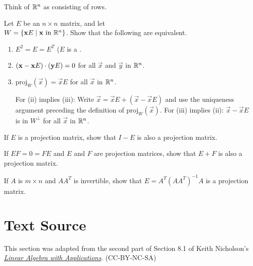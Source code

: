 \documentclass{ximera}
\begin{document}
\begin{problem}
Think of $\mathbb{R}^n$ as consisting of rows.

\begin{problem}\label{prob:8_1_17.1}
\item Let $E$ be an $n \times n$ matrix, and let \\ $W = \{\mathbf{x} E \mid \mathbf{x} \mbox{ in } \mathbb{R}^n\}$. Show that the following are equivalent.


\begin{enumerate}[label={\roman*.}]
\item $E^{2} = E = E^{T}$ ($E$ is a .

\item $(\mathbf{x} - \mathbf{x}E) \cdot (\mathbf{y}E) = 0$ for all $\vec{x}$ and $\vec{y}$ in $\mathbb{R}^n$.

\item $\mbox{proj}_W(\vec{x}) = \vec{x}E$ for all $\vec{x}$ in $\mathbb{R}^n$.
\begin{hint}
For (ii) implies (iii): Write $\vec{x} = \vec{x}E + (\vec{x} - \vec{x}E)$ and use the uniqueness argument preceding the definition of $\mbox{proj}_W(\vec{x})$. For (iii) implies (ii): $\vec{x} - \vec{x}E$ is in $W^\perp$ for all $\vec{x}$ in $\mathbb{R}^n$.
\end{hint}
\end{enumerate}
\end{problem}

\begin{problem}\label{prob:8_1_17.2}
If $E$ is a projection matrix, show that $I - E$ is also a projection matrix.
\end{problem}

\begin{problem}\label{prob:8_1_17.3}
If $EF = 0 = FE$ and $E$ and $F$ are projection matrices, show that $E + F$ is also a projection matrix.

\end{problem}

\begin{problem}\label{prob:8_1_17.4}
If $A$ is $m \times n$ and $AA^{T}$ is invertible, show that $E = A^{T}(AA^{T})^{-1}A$ is a projection matrix.
\end{problem}

\end{problem}




\section*{Text Source} This section was adapted from the second part of Section 8.1 of Keith Nicholson's \href{https://open.umn.edu/opentextbooks/textbooks/linear-algebra-with-applications}{\it Linear Algebra with Applications}. (CC-BY-NC-SA)
\end{document}
